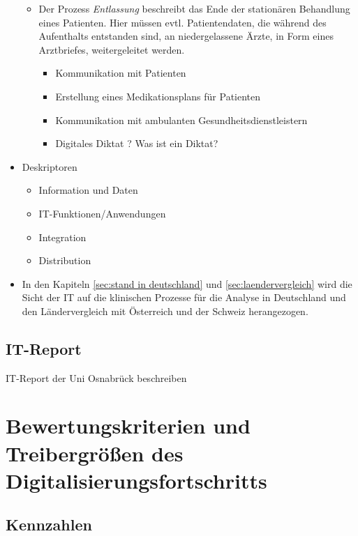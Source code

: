 \begin{itemize}
\begin{itemize}
				\item Der Prozess \textit{Entlassung} beschreibt das Ende der stationären Behandlung eines Patienten. Hier müssen evtl. Patientendaten, die während des Aufenthalts entstanden sind, an niedergelassene Ärzte, in Form eines Arztbriefes, weitergeleitet werden. 
				\begin{itemize}
					\item Kommunikation mit Patienten
					\item Erstellung eines Medikationsplans für Patienten
					\item Kommunikation mit ambulanten Gesundheitsdienstleistern
					\item Digitales Diktat ? Was ist ein Diktat?
				\end{itemize}
			\end{itemize}
			\item Deskriptoren
		\begin{itemize} 
			\item Information und Daten
			\item IT-Funktionen/Anwendungen
			\item Integration
			\item Distribution
		\end{itemize}
		\item In den Kapiteln \ref{sec:stand in deutschland} und \ref{sec:laendervergleich} wird die Sicht der IT auf die klinischen Prozesse für die Analyse in Deutschland und den Ländervergleich mit Österreich und der Schweiz herangezogen.
		\end{itemize}
	\subsection{IT-Report}
	IT-Report der Uni Osnabrück beschreiben
\section{Bewertungskriterien und Treibergrößen des Digitalisierungsfortschritts}
	\subsection{Kennzahlen}
